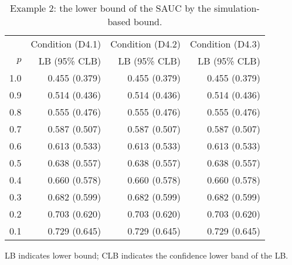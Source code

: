 \begin{table}

\caption{\label{tab:tab2}Example 2: the lower bound of the SAUC by the simulation-based bound.}
\centering
\begin{threeparttable}
\begin{tabular}[t]{rrrr}
\toprule
\multicolumn{1}{c}{} & \multicolumn{1}{c}{Condition (D4.1)} & \multicolumn{1}{c}{Condition (D4.2)} & \multicolumn{1}{c}{Condition (D4.3)} \\
\cmidrule(l{3pt}r{3pt}){2-2} \cmidrule(l{3pt}r{3pt}){3-3} \cmidrule(l{3pt}r{3pt}){4-4}
$p$ & LB (95\% CLB) & LB (95\% CLB) & LB (95\% CLB)\\
\midrule
1.0 & 0.455 (0.379) & 0.455 (0.379) & 0.455 (0.379)\\
0.9 & 0.514 (0.436) & 0.514 (0.436) & 0.514 (0.436)\\
0.8 & 0.555 (0.476) & 0.555 (0.476) & 0.555 (0.476)\\
0.7 & 0.587 (0.507) & 0.587 (0.507) & 0.587 (0.507)\\
0.6 & 0.613 (0.533) & 0.613 (0.533) & 0.613 (0.533)\\
0.5 & 0.638 (0.557) & 0.638 (0.557) & 0.638 (0.557)\\
0.4 & 0.660 (0.578) & 0.660 (0.578) & 0.660 (0.578)\\
0.3 & 0.682 (0.599) & 0.682 (0.599) & 0.682 (0.599)\\
0.2 & 0.703 (0.620) & 0.703 (0.620) & 0.703 (0.620)\\
0.1 & 0.729 (0.645) & 0.729 (0.645) & 0.729 (0.645)\\
\bottomrule
\end{tabular}
\begin{tablenotes}
\item 
           LB indicates lower bound; CLB indicates the confidence lower band of the LB.
\end{tablenotes}
\end{threeparttable}
\end{table}
